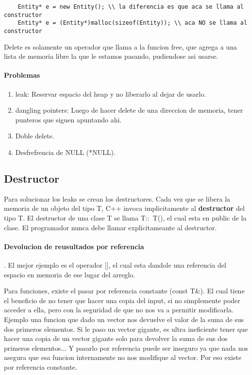 \documentclass[11pt]{article}
\begin{document}
\begin{lstlisting}
    Entity* e = new Entity(); \\ la diferencia es que aca se llama al constructor
    Entity* e = (Entity*)malloc(sizeof(Entity)); \\ aca NO se llama al constructor
\end{lstlisting}

Delete es solamente un operador que llama a la funcion free, que agrega a una lista
de memoria libre la que le estamos pasando, pudiendose asi usarse.

\paragraph{Problemas}
\begin{enumerate}
    \item leak: Reservar espacio del heap y no liberarlo al dejar de usarlo.
    \item dangling pointers: Luego de hacer delete de una direccion de memoria, tener
        punteros que siguen apuntando ahi.
    \item Doble delete.
    \item Desfrefrencia de NULL (*NULL).
\end{enumerate}

\subsection{Destructor}
Para solucionar los leaks se crean los destructores.
Cada vez que se libera la memoria de un objeto del tipo T, C++ invoca implicitamente
al \textbf{destructor} del tipo T.
El destructor de una clase T se llama T::~T(), el cual esta en public de la clase.
El programador nunca debe llamar explicitameante al destructor.


\paragraph{Devolucion de reusultados por referencia}.
El mejor ejemplo es el operador [], el cual esta dandole una referencia
del espacio en memoria de ese lugar del arreglo.
\vspace{0.5cm}

Para funciones, existe el pasar por referencia constante (const T\&).
El cual tiene el beneficio de no tener que hacer una copia del input, si no simplemente
poder acceder a ella, pero con la seguridad de que no nos va a permitir modificarla.
Ejemplo una funcion que dado un vector nos devuelve el valor de la suma de sus dos primeros
elementos.
Si le paso un vector gigante, es ultra ineficiente tener que hacer una copia de un
vector gigante solo para devolver la suma de sus dos primeros elementos...
Y pasarlo por referencia puede ser inseguro ya que nada nos asegura que esa funcion
internamente no nos modifique al vector.
Por eso existe por referencia constante.
\end{document}

